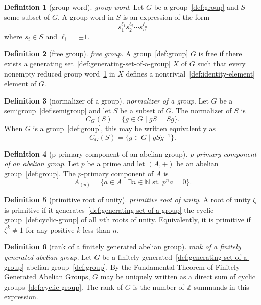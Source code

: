 \documentclass[12pt,a4paper]{article}
\theoremstyle{definition}
\newtheorem{definition}{Definition}
\begin{document}
\begin{definition}[group word]\label{def:group-word}
\emph{group word}. Let $G$ be a group~\ref{def:group} and $S$ some subset of $G$. A group word in $S$ is an expression of the form $$s_1^{\ell_1}s_2^{\ell_2}\cdots s_n^{\ell_n}$$ where $s_i \in S$ and $\ell_i = \pm 1$.
\end{definition}

\begin{definition}[free group]\label{def:free-group}
\emph{free group}. A group~\ref{def:group} $G$ is free if there exists a generating set~\ref{def:generating-set-of-a-group} $X$ of $G$ such that every nonempty reduced group word~\ref{def:group-word} in $X$ defines a nontrivial~\ref{def:identity-element} element of $G$.
\end{definition}

\begin{definition}[normalizer of a group]\label{def:normalizer-of-a-group}
\emph{normalizer of a group}. Let $G$ be a semigroup~\ref{def:semigroup} and let $S$ be a subset of $G$. The normalizer of $S$ is $$C_G(S) = \{g\in G\mid gS=Sg\}.$$ When $G$ is a group~\ref{def:group}, this may be written equivalently as $$C_G(S) = \{g\in G\mid gSg^{-1}\}.$$
\end{definition}

\begin{definition}[p-primary component of an abelian group]\label{def:p-primary-component-of-an-abelian-group}
\emph{p-primary component of an abelian group}. Let $p$ be a prime and let $(A,+)$ be an abelian group~\ref{def:group}. The $p$-primary component of $A$ is $$A_{(p)} = \{a\in A\mid \exists n\in\mathbb N \text{ st. }p^na= 0\}.$$
\end{definition}

\begin{definition}[primitive root of unity]\label{def:primitive-root-of-unity}
\emph{primitive root of unity}. A root of unity $\zeta$ is primitive if it generates~\ref{def:generating-set-of-a-group} the cyclic group~\ref{def:cyclic-group} of all $n$th roots of unity. Equivalently, it is primitive if $\zeta^k\neq 1$ for any positive $k$ less than $n$.
\end{definition}

\begin{definition}[rank of a finitely generated abelian group]\label{def:rank-of-a-finitely-generated-abelian-group}
\emph{rank of a finitely generated abelian group}. Let $G$ be a finitely generated~\ref{def:generating-set-of-a-group} abelian group~\ref{def:group}. By the  Fundamental Theorem of Finitely Generated Abelian Groups, $G$ may be uniquely written as a direct sum of cyclic groups~\ref{def:cyclic-group}. The rank of $G$ is the number of $\mathbb Z$ summands in this expression.
\end{definition}
\end{document}
